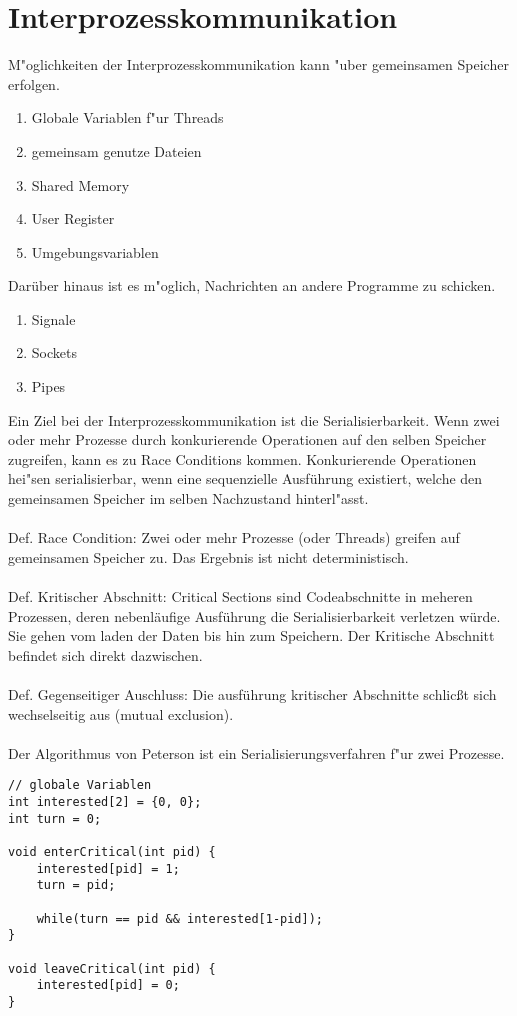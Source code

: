 \section{Interprozesskommunikation}

M"oglichkeiten der Interprozesskommunikation kann "uber gemeinsamen Speicher erfolgen. 
\begin{enumerate}
	\item Globale Variablen f"ur Threads
	\item gemeinsam genutze Dateien
	\item Shared Memory
	\item User Register
	\item Umgebungsvariablen
\end{enumerate} 
Darüber hinaus ist es m"oglich, Nachrichten an andere Programme zu schicken.
\begin{enumerate}
	\item Signale
	\item Sockets
	\item Pipes
\end{enumerate}

Ein Ziel bei der Interprozesskommunikation ist die Serialisierbarkeit. Wenn zwei oder mehr Prozesse durch konkurierende Operationen auf den selben Speicher zugreifen, kann es zu Race Conditions kommen. Konkurierende Operationen hei"sen serialisierbar, wenn eine sequenzielle Ausführung existiert, welche den gemeinsamen Speicher im selben Nachzustand hinterl"asst.
\\\\
Def. Race Condition:
Zwei oder mehr Prozesse (oder Threads) greifen auf gemeinsamen Speicher zu. Das Ergebnis ist nicht deterministisch.
\\\\
Def. Kritischer Abschnitt:
Critical Sections sind Codeabschnitte in meheren Prozessen, deren nebenläufige Ausführung die Serialisierbarkeit verletzen würde. Sie gehen vom laden der Daten bis hin zum Speichern. Der Kritische Abschnitt befindet sich direkt dazwischen. 
\\\\
Def. Gegenseitiger Auschluss:
Die ausführung kritischer Abschnitte schlicßt sich wechselseitig aus (mutual exclusion).
\\\\
Der Algorithmus von Peterson ist ein Serialisierungsverfahren f"ur zwei Prozesse. 
\lstset{language=c} 
\begin{lstlisting}[breaklines,showstringspaces=false,frame=none] 
// globale Variablen
int interested[2] = {0, 0};
int turn = 0;

void enterCritical(int pid) {
	interested[pid] = 1;
	turn = pid;

	while(turn == pid && interested[1-pid]);
}

void leaveCritical(int pid) {
	interested[pid] = 0;
} 

\end{lstlisting} 

